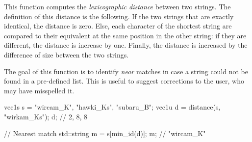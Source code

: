 This function computes the \emph{lexicographic distance} between two strings. The definition of this distance is the following. If the two strings that are exactly identical, the distance is zero. Else, each character of the shortest string are compared to their equivalent at the same position in the other string: if they are different, the distance is increase by one. Finally, the distance is increased by the difference of size between the two strings.

The goal of this function is to identify \emph{near} matches in case a string could not be found in a pre-defined list. This is useful to suggest corrections to the user, who may have misspelled it.

\begin{example}
\begin{cppcode}
vec1s s = {"wircam_K", "hawki_Ks", "subaru_B"};
vec1u d = distance(s, "wirkam_Ks");
d; // {2, 8, 8}

// Nearest match
std::string m = s[min_id(d)];
m; // "wircam_K"
\end{cppcode}
\end{example}

